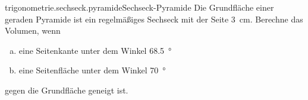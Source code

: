 \begin{exercise}{trigonometrie.sechseck.pyramide}{Sechseck-Pyramide}
  \ifproblem\problem
    Die Grundfläche einer geraden Pyramide ist ein regelmäßiges
    Sechseck mit der Seite \SI{3}{\centi\metre}. Berechne das
    Volumen, wenn
    \begin{enumerate}[a)]
      \item eine Seitenkante unter dem Winkel \SI{68.5}{\degree}
      \item eine Seitenfläche unter dem Winkel \SI{70}{\degree}
    \end{enumerate}
    gegen die Grundfläche geneigt ist.
  \fi
\end{exercise}
